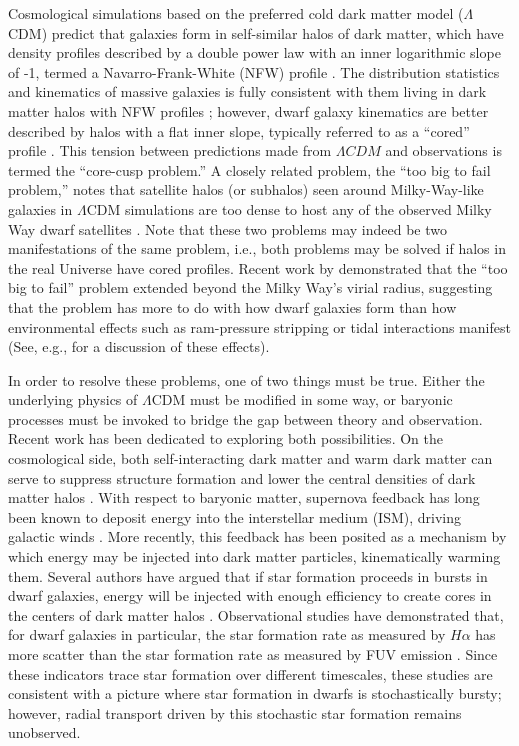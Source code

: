 \documentclass[iop]{emulateapj}
\begin{document}
Cosmological simulations based on the preferred cold dark matter model ($\Lambda$CDM) predict that galaxies form in self-similar halos of dark matter, which have density profiles described by a double power law with an inner logarithmic slope of -1, termed a Navarro-Frank-White (NFW) profile \citep{NFW}. The distribution statistics and kinematics of massive galaxies is fully consistent with them living in dark matter halos with NFW profiles \citep{Wambsganss04,Springel05,BK09,Klypin11}; however, dwarf galaxy kinematics are better described by halos with a flat inner slope, typically referred to as a ``cored'' profile \citep{Moore94,McGaugh01,Marchesini02,Simon05,deblok08}. This tension between predictions made from $\Lambda CDM$ and observations is termed the ``core-cusp problem.'' A closely related problem, the ``too big to fail problem,''  notes that satellite halos (or subhalos) seen around Milky-Way-like galaxies in $\Lambda$CDM simulations are too dense to host any of the observed Milky Way dwarf satellites \citep{BK11,BK12}. Note that these two problems may indeed be two manifestations of the same problem, i.e., both problems may be solved if halos in the real Universe have cored profiles. Recent work by \cite{GK14} demonstrated that the ``too big to fail'' problem extended beyond the Milky Way's virial radius, suggesting that the problem has more to do with how dwarf galaxies form than how environmental effects such as ram-pressure stripping or tidal interactions manifest (See, e.g., \citet{Gunn72,Larson80,Farouki81,Moore96,Balogh2000} for a discussion of these effects).

In order to resolve these problems, one of two things must be true. Either the underlying physics of $\Lambda$CDM must be modified in some way, or baryonic processes must be invoked to bridge the gap between theory and observation. Recent work has been dedicated to exploring both possibilities. On the cosmological side, both self-interacting dark matter and warm dark matter can serve to suppress structure formation and lower the central densities of dark matter halos \citep{Lovell14,Elbert14}. With respect to baryonic matter, supernova feedback has long been known to deposit energy into the interstellar medium (ISM), driving galactic winds \citep{Larson74,Dekel86}. More recently, this feedback has been posited as a mechanism by which energy may be injected into dark matter particles, kinematically warming them. Several authors have argued that if star formation proceeds in bursts in dwarf galaxies, energy will be injected with enough efficiency to create cores in the centers of dark matter halos \citep{Governato10,Governato12,PG12}. Observational studies have demonstrated that, for dwarf galaxies in particular, the star formation rate as measured by $H\alpha$ has more scatter than the star formation rate as measured by FUV emission \citep{Sullivan00,Boselli09,Lee09,Shivaei15,Guo16,Sparre17}. Since these indicators trace star formation over different timescales, these studies are consistent with a picture where star formation in dwarfs is stochastically bursty; however, radial transport driven by this stochastic star formation remains unobserved.
\end{document}
